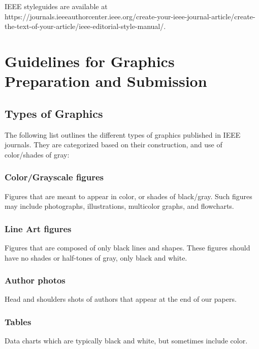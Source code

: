 \documentclass[journal,twoside,web]{ieeecolor}
\begin{document}
IEEE styleguides are available at
https://journals.\discretionary{}{}{}ieeeauthorcenter.ieee.org/create-your-ieee-journal-article/\discretionary{}{}{}create-the-text-of-your-article/\discretionary{}{}{}ieee-editorial-style-manual/.

\section{Guidelines for Graphics Preparation and Submission}
\label{sec:guidelines}

\subsection{Types of Graphics}
The following list outlines the different types of graphics published in 
IEEE journals. They are categorized based on their construction, and use of 
color/shades of gray:

\subsubsection{Color/Grayscale figures}
{Figures that are meant to appear in color, or shades of black/gray. Such 
figures may include photographs, illustrations, multicolor graphs, and 
flowcharts.}

\subsubsection{Line Art figures}
{Figures that are composed of only black lines and shapes. These figures 
should have no shades or half-tones of gray, only black and white.}

\subsubsection{Author photos}
{Head and shoulders shots of authors that appear at the end of our papers. }

\subsubsection{Tables}
{Data charts which are typically black and white, but sometimes include 
color.}
\end{document}
